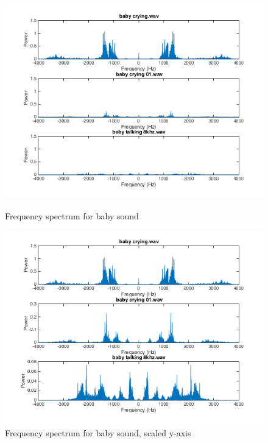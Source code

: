 \begin{figure}[H]
  \centering
  \begin{minipage}[b]{0.6\textwidth}
    \includegraphics[width=1\textwidth]{sections/freq_spec_baby_linkaxis.png}
    \caption{Frequency spectrum for baby sound}
    \label{fig:baby_spec}
  \end{minipage}
  \begin{minipage}[b]{0.6\textwidth}
    \includegraphics[width=1\textwidth]{sections/freq_spec_babyFix.png}
    \caption{Frequency spectrum for baby sound, scaled y-axis}
    \label{fig:enhanced}
  \end{minipage}
\end{figure}

